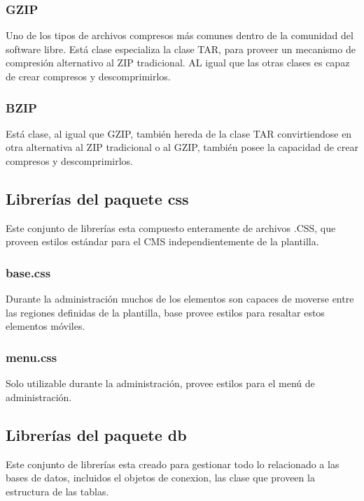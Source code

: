 \subsubsection{GZIP}
Uno de los tipos de archivos compresos m\'as comunes dentro de la comunidad del software libre. Est\'a clase especializa la clase TAR, para proveer un mecanismo de compresi\'on alternativo al ZIP tradicional. AL igual que las otras clases es capaz de crear compresos y descomprimirlos.
\subsubsection{BZIP}
Est\'a clase, al igual que GZIP, tambi\'en hereda de la clase TAR convirtiendose en otra alternativa al ZIP tradicional o al GZIP, tambi\'en posee la capacidad de crear compresos y descomprimirlos.

\subsection{Librer\'ias del paquete \textsf{css}}
Este conjunto de librer\'ias esta compuesto enteramente de archivos .CSS, que proveen estilos est\'andar para el CMS independientemente de la plantilla.
\subsubsection{base.css}
Durante la administraci\'on muchos de los elementos son capaces de moverse entre las regiones definidas de la plantilla, \textsf{base} provee estilos para resaltar estos elementos m\'oviles.
\subsubsection{menu.css}
Solo utilizable durante la administraci\'on, provee estilos para el men\'u de administraci\'on.

\subsection{Librer\'ias del paquete \textsf{db}}
Este conjunto de librer\'ias esta creado para gestionar todo lo relacionado a las bases de datos, incluidos el objetos de conexion, las clase que proveen la estructura de las tablas.
